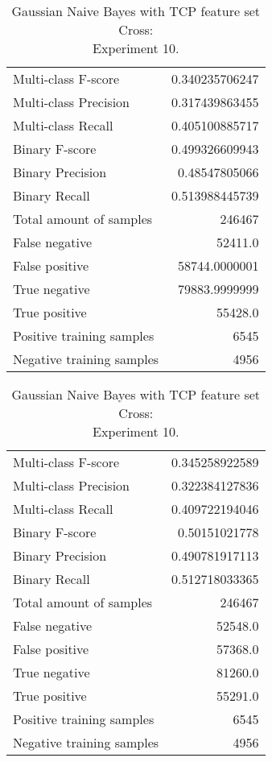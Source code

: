 \begin{table}[H]
\begin{minipage}{0.5\textwidth}
\caption{Gaussian Naive Bayes with TCP feature set Cross: \\Experiment 9.}
\centering
\begin{tabular}{l r}
\toprule
Multi-class F-score & 0.340235706247 \\
Multi-class Precision & 0.317439863455 \\
Multi-class Recall & 0.405100885717 \\
\midrule
Binary F-score & 0.499326609943 \\
Binary Precision & 0.48547805066 \\
Binary Recall & 0.513988445739 \\
\midrule
Total amount of samples & 246467 \\
False negative & 52411.0 \\
False positive & 58744.0000001 \\
True negative & 79883.9999999 \\
True positive & 55428.0 \\
\midrule
Positive training samples & 6545 \\
Negative training samples & 4956 \\
\bottomrule
\end{tabular}
\end{minipage}
\hfillx
\begin{minipage}{0.5\textwidth}
\caption{Gaussian Naive Bayes with TCP feature set Cross: \\Experiment 10.}
\centering
\begin{tabular}{l r}
\toprule
Multi-class F-score & 0.345258922589 \\
Multi-class Precision & 0.322384127836 \\
Multi-class Recall & 0.409722194046 \\
\midrule
Binary F-score & 0.50151021778 \\
Binary Precision & 0.490781917113 \\
Binary Recall & 0.512718033365 \\
\midrule
Total amount of samples & 246467 \\
False negative & 52548.0 \\
False positive & 57368.0 \\
True negative & 81260.0 \\
True positive & 55291.0 \\
\midrule
Positive training samples & 6545 \\
Negative training samples & 4956 \\
\bottomrule
\end{tabular}
\end{minipage}
\end{table}
